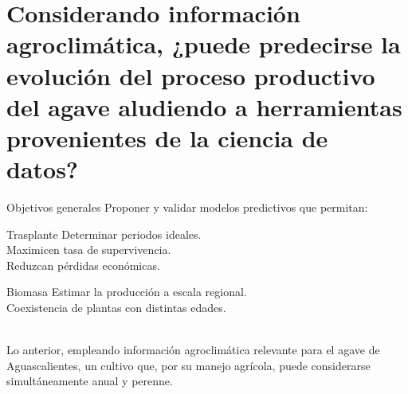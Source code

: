 \documentclass[aspectratio=169]{beamer}
\begin{document}
\section{Considerando información agroclimática, ¿puede predecirse la evolución del proceso productivo del agave aludiendo a herramientas provenientes de la ciencia de datos?}


\begin{frame}{Objetivos generales}
	\vspace{-1.5cm}Proponer y validar modelos predictivos que permitan: 
	
	\begin{minipage}{0.5\textwidth}
		\pause\begin{block}{Trasplante}
			Determinar periodos ideales.\\ 
			\pause Maximicen tasa de supervivencia.\\
			Reduzcan pérdidas económicas.
		\end{block}
	\end{minipage}%
	\begin{minipage}{0.5\textwidth}\pause\begin{block}{Biomasa\phantom{p}}
			Estimar la producción a escala regional.\\
			\pause Coexistencia de plantas con distintas edades.\phantom{p}
		\end{block}%
	\end{minipage}
	
	\,\\
	\pause
	Lo anterior, empleando información agroclimática relevante para el agave de Aguascalientes, un cultivo que, por su manejo agrícola, puede considerarse simultáneamente anual y perenne.
\end{frame}
\end{document}
